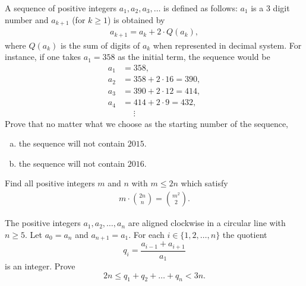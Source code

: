 \documentclass[problems.tex]{subfile}
\begin{document}
	
	\begin{problem}
		A sequence of positive integers $a_1, a_2, a_3, \dots$ is defined as follows: $a_1$ is a $3$ digit number and $a_{k+1}$ (for $k \geq 1$) is obtained by
		\begin{align*}
			a_{k+1} = a_k + 2 \cdot Q(a_k),
		\end{align*}
		where $Q(a_k)$ is the sum of digits of $a_k$ when represented in decimal system. For instance, if one takes $a_1 = 358$ as the initial term, the sequence would be
		\begin{align*}
			a_1 &= 358,\\
			a_2 &= 358 + 2 \cdot 16 = 390,\\
			a_3 &= 390+ 2 \cdot 12 = 414,\\
			a_4 &= 414 + 2 \cdot 9 = 432,\\
			&\phantom{=}\vdots
		\end{align*}
		Prove that no matter what we choose as the starting number of the sequence,
		\begin{enumerate}[(a)]
			\item the sequence will not contain $2015$.
			\item the sequence will not contain $2016$.		
		\end{enumerate}
	\end{problem}
	
	
	
	\begin{problem}
		Find all positive integers $m$ and $n$ with $m \leq 2n$ which satisfy
		\begin{align*}
			m \cdot \binom{2n}{n} = \binom{m^2}{2}.
		\end{align*}
	\end{problem}
	
	
	
	\begin{problem}
		The positive integers $a_1,a_2, \dots, a_n$ are aligned clockwise in a circular line with $n \geq 5$. Let $a_0=a_n$ and $a_{n+1}=a_1$. For each $i \in \{1,2,\dots,n \}$ the quotient \[ q_i=\frac{a_{i-1}+a_{i+1}}{a_1} \]is an integer. Prove \[ 2n \leq q_1+q_2+\dots+q_n < 3n. \] %
	\end{problem}
	
\end{document}
